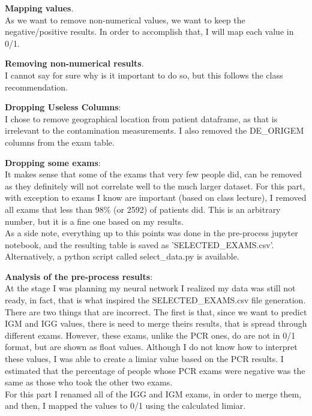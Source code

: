\documentclass[]{article}
\begin{document}
\begin{description}
	\item \textbf{Mapping values}.\\
	As we want to remove non-numerical values, we want to keep the negative/positive results. In order to accomplish that, I will map each value in 0/1.
	
	\item \textbf{Removing non-numerical results}.\\
	I cannot say for sure why is it important to do so, but this follows the class recommendation.
	
	\item \textbf{Dropping Useless Columns}:\\
	I chose to remove geographical location from patient dataframe, as that is irrelevant to the contamination measurements. I also removed the DE\_ORIGEM columns from the exam table.
	
	\item \textbf{Dropping some exams}:\\
	It makes sense that some of the exams that very few people did, can be removed as they definitely will not correlate well to the much larger dataset. For this part, with exception to exams I know are important (based on class lecture), I removed all exams that less than 98\% (or 2592) of patients did. This is an arbitrary number, but it is a fine one based on my results.\\
	As a side note, everything up to this points was done in the pre-process jupyter notebook, and the resulting table is saved as 'SELECTED\_EXAMS.csv'. Alternatively, a python script called select\_data.py is available.

	\item \textbf{Analysis of the pre-process results}:\\
	At the stage I was planning my neural network I realized my data was still not ready, in fact, that is what inspired the SELECTED\_EXAMS.csv file generation. There are two things that are incorrect. The first is that, since we want to predict IGM and IGG values, there is need to merge theirs results, that is spread through different exams. However, these exams, unlike the PCR ones, do are not in 0/1 format, but are shown as float values. Although I do not know how to interpret these values, I was able to create a limiar value based on the PCR results. I estimated that the percentage of people whose PCR exams were negative was the same as those who took the other two exams.\\
	For this part I renamed all of the IGG and IGM exams, in order to merge them, and then, I mapped the values to 0/1 using the calculated limiar.


\end{description}
\end{document}
